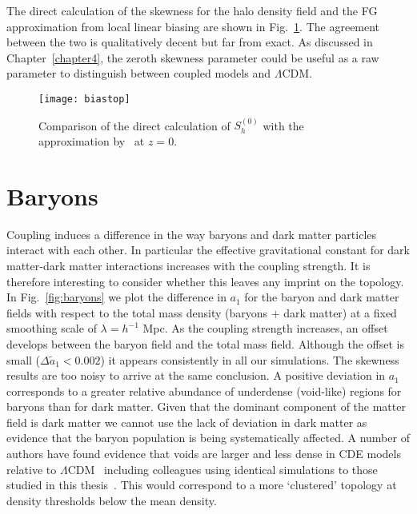 The direct calculation of the skewness for the halo density field and the FG approximation from local linear biasing are shown in Fig.~\ref{fig:biastop}. The agreement between the two is qualitatively decent but far from exact. As discussed in Chapter~\ref{chapter4}, the zeroth skewness parameter could be useful as a raw parameter to distinguish between coupled models and $\Lambda$CDM.


\begin{figure}
	\centering
	\texttt{[image: biastop]}
    \caption{Comparison of the direct calculation of $S^{(0)}_h$ with the approximation by~\citet{Fry1993} at $z=0$.}
    \label{fig:biastop}
\end{figure}


\section{Baryons}

Coupling induces a difference in the way baryons and dark matter particles interact with each other. In particular the effective gravitational constant for dark matter-dark matter interactions increases with the coupling strength. 	It is therefore interesting to consider whether this leaves any imprint on the topology. In Fig.~\ref{fig:baryons} we plot the difference in $a_1$ for the baryon and dark matter fields with respect to the total mass density (baryons $+$ dark matter) at a fixed smoothing scale of $\lambda = h^{-1}$ Mpc. As the coupling strength increases, an offset develops between the baryon field and the total mass field. Although the offset is small ($\Delta \tilde{a}_1 < 0.002 $) it appears consistently in all our simulations. The skewness results are too noisy to arrive at the same conclusion. A positive deviation in $a_1$ corresponds to a greater relative abundance of underdense (void-like) regions for baryons than for dark matter. Given that the dominant component of the matter field is dark matter we cannot use the lack of deviation in dark matter as evidence that the baryon population is being systematically affected. A number of authors have found evidence that voids are larger and less dense in CDE models relative to $\Lambda$CDM~\citep{Pollina2016,2015MNRAS.446L...1S} including colleagues using identical simulations to those studied in this thesis~\citep{Adermann2017}. This would correspond to a more `clustered' topology at density thresholds below the mean density.


